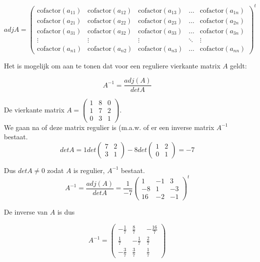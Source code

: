 \[ adj{A}=\left( \begin{matrix}
\text{cofactor}(a_{11}) & \text{cofactor}(a_{12}) & \text{cofactor}(a_{13}) & \ldots & \text{cofactor}(a_{1n}) \\
\text{cofactor}(a_{21}) & \text{cofactor}(a_{22}) & \text{cofactor}(a_{23}) & \ldots & \text{cofactor}(a_{2n}) \\ 
\text{cofactor}(a_{31}) & \text{cofactor}(a_{32}) & \text{cofactor}(a_{33}) & \ldots & \text{cofactor}(a_{3n}) \\
\vdots & \vdots &  \vdots & \ddots & \vdots \\
\text{cofactor}(a_{n1}) & \text{cofactor}(a_{n2}) & \text{cofactor}(a_{n3}) & \ldots & \text{cofactor}(a_{nn})
\end{matrix} \right)^{t}           \]


Het is mogelijk om aan te tonen dat voor een reguliere vierkante matrix $A$ geldt:


	\[  A^{-1}=\frac{adj(A)}{det A}    \]


\begin{voorbeeld}
	

De vierkante matrix $A= \left( \begin{matrix} 1 & 8 & 0 \\ 1 & 7 & 2 \\ 0 & 3 & 1 \end{matrix} \right)$.\\

We gaan na of deze matrix regulier is (m.a.w. of er een inverse matrix $A^{-1}$ bestaat.\\
  
\[ det A= 1 det \left( \begin{matrix} 7 & 2 \\ 3 & 1 \end{matrix} \right) -8 det \left( \begin{matrix} 1 & 2 \\ 0 & 1 \end{matrix} \right) = -7   \]

Dus $det A \neq 0$ zodat $A$ is regulier, $A^{-1}$ bestaat.\\

\[  A^{-1}= \frac{adj(A)}{det A} = \frac{1}{-7} \left( \begin{matrix}
1 & -1 & 3 \\
-8 & 1 & -3 \\
16 & -2 & -1 
\end{matrix} \right)^{t}                   \]

De inverse van $A$ is dus

\[ A^{-1}= \left( \begin{matrix}
-\frac{1}{7} & \frac{8}{7} & -\frac{16}{7} \\
\frac{1}{7} & -\frac{1}{7} & \frac{2}{7} \\
-\frac{3}{7} & \frac{3}{7} & \frac{1}{7}
\end{matrix}   \right)
\]

\end{voorbeeld}

